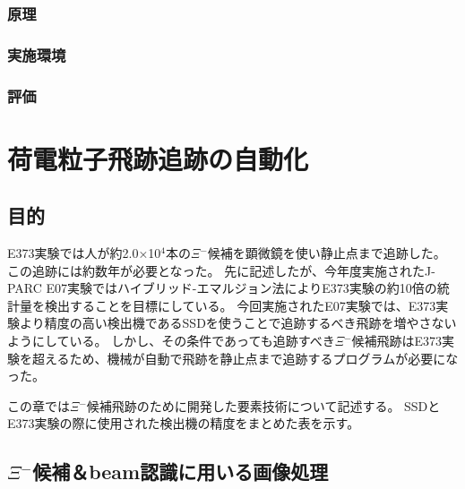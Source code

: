 \documentclass[12pt,a4paper]{jarticle}
\begin{document}
\subsubsection{原理}
\subsubsection{実施環境}
\subsubsection{評価}

\newpage
\section{荷電粒子飛跡追跡の自動化}
\subsection{目的}
E373実験では人が約2.0×10$^4$本の$\Xi$$^-$候補を顕微鏡を使い静止点まで追跡した。
この追跡には約数年が必要となった。
先に記述したが、今年度実施されたJ-PARC E07実験ではハイブリッド-エマルジョン法によりE373実験の約10倍の統計量を検出することを目標にしている。
今回実施されたE07実験では、E373実験より精度の高い検出機であるSSDを使うことで追跡するべき飛跡を増やさないようにしている。
しかし、その条件であっても追跡すべき$\Xi$$^-$候補飛跡はE373実験を超えるため、機械が自動で飛跡を静止点まで追跡するプログラムが必要になった。
\par
この章では$\Xi$$^-$候補飛跡のために開発した要素技術について記述する。
SSDとE373実験の際に使用された検出機の精度をまとめた表を示す。
\subsection{$\Xi$$^-$候補＆beam認識に用いる画像処理}
\end{document}
